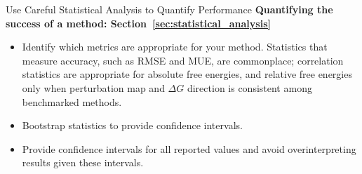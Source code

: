 \documentclass[9pt,bestpractices,pubversion]{livecoms}
\begin{document}
%
\begin{Checklists*}[ht!]
\begin{checklist}{Use Careful Statistical Analysis to Quantify Performance}
\textbf{Quantifying the success of a method: Section~\ref{sec:statistical_analysis}}
\begin{itemize}
\item Identify which metrics are appropriate for your method. Statistics that measure accuracy, such as RMSE and MUE, are commonplace; correlation statistics are appropriate for absolute free energies, and relative free energies only when perturbation map and $\Delta G$ direction is consistent among benchmarked methods.
\item Bootstrap statistics to provide confidence intervals. 
\item Provide confidence intervals for all reported values and avoid overinterpreting results given these intervals.
\end{itemize}
\end{checklist}
\end{Checklists*}
\clearpage
\end{document}
